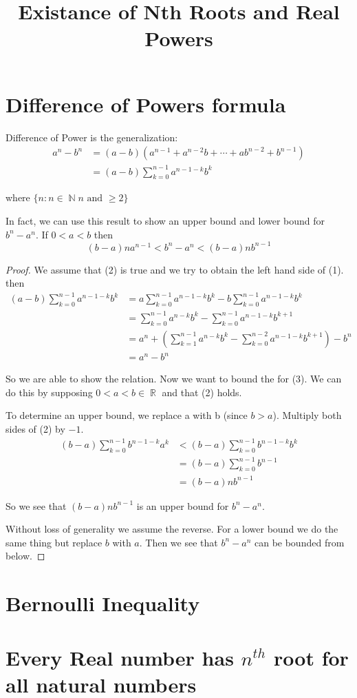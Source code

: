 \documentclass[a4paper, 11pt]{article}
\title{Existance of Nth Roots and Real Powers}
\DeclareMathOperator{\N}{\mathbb{N}}
\DeclareMathOperator{\R}{\mathbb{R}}
\begin{document}
\section{Difference of Powers formula}
Difference of Power is the generalization:
\begin{align}
  a^{n} - b^{n} &= (a - b)(a^{n - 1} + a^{n - 2}b + \cdots + ab^{n - 2} + b ^{n - 1}) \\
                &= (a - b) \sum_{k=0}^{n-1}a^{n- 1 - k }b ^{k}
\end{align}

where $\lbrace n : n \in \N n \text{ and } \geq 2 \rbrace$

In fact, we can use this result to show an upper bound and lower bound for $b^{n} - a^{n}$. If $0 < a < b$
then 
\begin{equation}
  (b - a)n a ^{n - 1} < b^{n} - a^{n} < (b - a)n b ^{n - 1}
\end{equation}

\begin{proof}
We assume that (2) is true and we try to obtain the left hand side of (1). then
\begin{align*}
  (a - b)\sum_{k=0}^{n-1}a^{n-1-k}b^{k} &= a \sum_{k=0}^{n -1}a^{n-1-k}b^{k} - b \sum_{k=0}^{n-1}a^{n-1-k}b^{k} \\
    &= \sum_{k=0}^{n -1}a^{n-k}b^{k} - \sum_{k=0}^{n-1}a^{n-1-k}b^{k+1} \\
    &= a^{n} + \left( \sum_{k=1}^{n -1}a^{n-k}b^{k} - \sum_{k=0}^{n-2}a^{n-1-k}b^{k+1}  \right) - b^{n} \\
    &= a^{n} - b^{n}
\end{align*}

So we are able to show the relation. Now we want to bound the for (3). We can do this by supposing 
$0 < a < b \in \R$ and that (2) holds.

To determine an upper bound, we replace a with b (since $b > a$). Multiply both sides of (2) by $-1$.
\begin{align*}
  (b - a)\sum_{k=0}^{n-1}b^{n-1-k}a^{k} &< (b - a) \sum_{k=0}^{n-1}b^{n-1-k}b^{k} \\
    &= (b - a) \sum_{k=0}^{n-1}b^{n-1} \\
    &= (b - a) n b^{n-1}
\end{align*}

So we see that $(b -a)nb ^{n-1}$ is an upper bound for $b^{n} - a^{n}$.

Without loss of generality we assume the reverse. For a lower bound we do the same thing but replace $b$ with $a$.
Then we see that $b^{n} - a^{n}$ can be bounded from below.

\end{proof}

\section{Bernoulli Inequality}
\section{Every Real number has $n^{th}$ root for all natural numbers}
\end{document}
